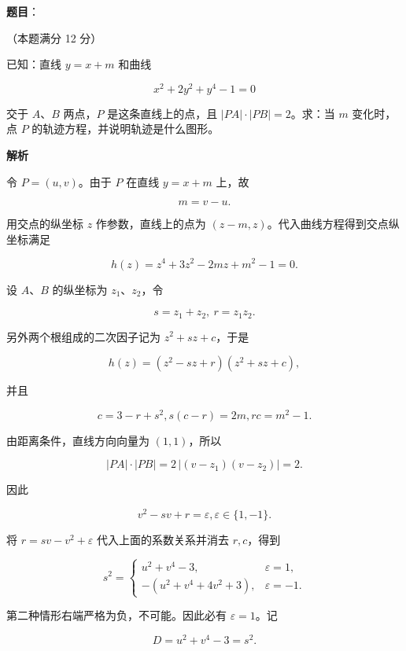 \begin{answer}

\textbf{题目}：

（本题满分 12 分）

已知：直线 $y=x+m$ 和曲线

\nopagebreak[4]
\[
x^2+2y^2+y^4-1=0
\]

交于 $A\text{、}B$ 两点，$P$ 是这条直线上的点，且 $|PA|\cdot|PB|=2$。求：当 $m$ 变化时，点 $P$ 的轨迹方程，并说明轨迹是什么图形。

\textbf{解析}

令 $P=(u,v)$。由于 $P$ 在直线 $y=x+m$ 上，故

\nopagebreak[4]
\[
m=v-u.
\]

用交点的纵坐标 $z$ 作参数，直线上的点为 $(z-m,z)$。代入曲线方程得到交点纵坐标满足

\nopagebreak[4]
\[
h(z)=z^4+3z^2-2mz+m^2-1=0.
\]

设 $A\text{、}B$ 的纵坐标为 $z_1\text{、}z_2$，令

\nopagebreak[4]
\[
s=z_1+z_2,\ r=z_1z_2.
\]

另外两个根组成的二次因子记为 $z^2+sz+c$，于是

\nopagebreak[4]
\[
h(z)=(z^2-sz+r)(z^2+sz+c),
\]

并且

\nopagebreak[4]
\[
c=3-r+s^2, s(c-r)=2m, rc=m^2-1.
\]

由距离条件，直线方向向量为 $(1,1)$，所以

\nopagebreak[4]
\[
|PA|\cdot|PB|=2\,|(v-z_1)(v-z_2)|=2.
\]

因此

\nopagebreak[4]
\[
v^2-sv+r=\varepsilon, \varepsilon\in\{1,-1\}.
\]

将 $r=sv-v^2+\varepsilon$ 代入上面的系数关系并消去 $r,c$，得到

\nopagebreak[4]
\[
s^2=
\begin{cases}
u^2+v^4-3,&\varepsilon=1,\\
-(u^2+v^4+4v^2+3),&\varepsilon=-1.
\end{cases}
\]

第二种情形右端严格为负，不可能。因此必有 $\varepsilon=1$。记

\nopagebreak[4]
\[
D=u^2+v^4-3=s^2.
\]


\end{answer}
